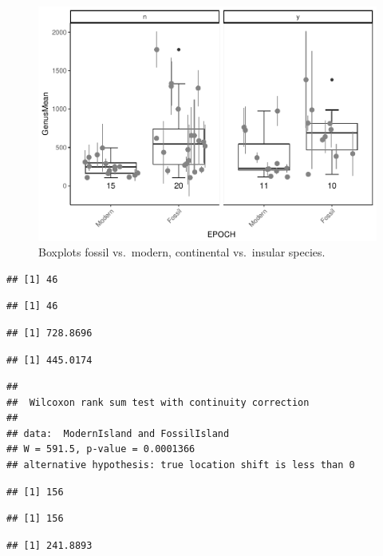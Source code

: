 \documentclass[]{article}
\begin{document}
\begin{figure}[htbp]
\centering
\includegraphics{MA_JJ_files/figure-latex/Boxplots fossil vs. modern, continental vs. insular-1.pdf}
\caption{Boxplots fossil vs.~modern, continental vs.~insular species.}
\end{figure}

\begin{verbatim}
## [1] 46
\end{verbatim}

\begin{verbatim}
## [1] 46
\end{verbatim}

\begin{verbatim}
## [1] 728.8696
\end{verbatim}

\begin{verbatim}
## [1] 445.0174
\end{verbatim}

\begin{verbatim}
## 
##  Wilcoxon rank sum test with continuity correction
## 
## data:  ModernIsland and FossilIsland
## W = 591.5, p-value = 0.0001366
## alternative hypothesis: true location shift is less than 0
\end{verbatim}

\begin{verbatim}
## [1] 156
\end{verbatim}

\begin{verbatim}
## [1] 156
\end{verbatim}

\begin{verbatim}
## [1] 241.8893
\end{verbatim}
\end{document}
